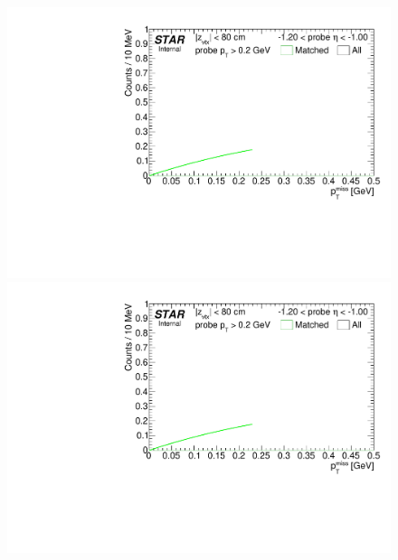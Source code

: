 \begin{figure}[ht]
{  \includegraphics[width=\linewidth,page=5]{graphics/systematicsEfficiency/TOF_tagAndProbe/Fitting_effVsEta_mc.pdf}\\
  \includegraphics[width=\linewidth,page=6]{graphics/systematicsEfficiency/TOF_tagAndProbe/Fitting_effVsEta_mc.pdf}
}%
\end{figure}
